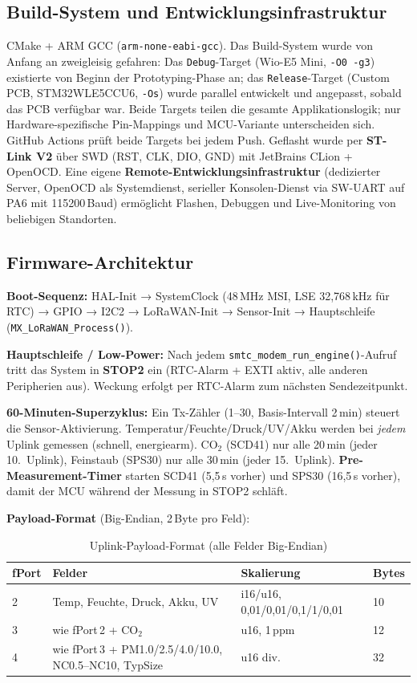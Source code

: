 \documentclass[11pt,a4paper]{scrartcl}
\begin{document}
\subsection*{Build-System und Entwicklungsinfrastruktur}

CMake + ARM GCC (\texttt{arm-none-eabi-gcc}). Das Build-System wurde von Anfang an zweigleisig gefahren: Das \texttt{Debug}-Target (Wio-E5 Mini, \texttt{-O0 -g3}) existierte von Beginn der Prototyping-Phase an; das \texttt{Release}-Target (Custom PCB, STM32WLE5CCU6, \texttt{-Os}) wurde parallel entwickelt und angepasst, sobald das PCB verfügbar war. Beide Targets teilen die gesamte Applikationslogik; nur Hardware-spezifische Pin-Mappings und MCU-Variante unterscheiden sich. GitHub Actions prüft beide Targets bei jedem Push. Geflasht wurde per \textbf{ST-Link V2} über SWD (RST, CLK, DIO, GND) mit JetBrains CLion + OpenOCD. Eine eigene \textbf{Remote-Entwicklungsinfrastruktur} (dedizierter Server, OpenOCD als Systemdienst, serieller Konsolen-Dienst via SW-UART auf PA6 mit 115200\,Baud) ermöglicht Flashen, Debuggen und Live-Monitoring von beliebigen Standorten.

\subsection*{Firmware-Architektur}

\textbf{Boot-Sequenz:} HAL-Init → SystemClock (48\,MHz MSI, LSE 32,768\,kHz für RTC) → GPIO → I2C2 → LoRaWAN-Init → Sensor-Init → Hauptschleife (\texttt{MX\_LoRaWAN\_Process()}).

\textbf{Hauptschleife / Low-Power:} Nach jedem \texttt{smtc\_modem\_run\_engine()}-Aufruf tritt das System in \textbf{STOP2} ein (RTC-Alarm + EXTI aktiv, alle anderen Peripherien aus). Weckung erfolgt per RTC-Alarm zum nächsten Sendezeitpunkt.

\textbf{60-Minuten-Superzyklus:} Ein Tx-Zähler (1–30, Basis-Intervall 2\,min) steuert die Sensor-Aktivierung. Temperatur/Feuchte/Druck/UV/Akku werden bei \textit{jedem} Uplink gemessen (schnell, energiearm). CO$_2$ (SCD41) nur alle 20\,min (jeder 10.~Uplink), Feinstaub (SPS30) nur alle 30\,min (jeder 15.~Uplink). \textbf{Pre-Measurement-Timer} starten SCD41 (5,5\,s vorher) und SPS30 (16,5\,s vorher), damit der MCU während der Messung in STOP2 schläft.

\textbf{Payload-Format} (Big-Endian, 2\,Byte pro Feld):

\begin{table}[H]
  \centering
  \small
  \begin{tabular}{llll}
    \hline
    \textbf{fPort} & \textbf{Felder} & \textbf{Skalierung} & \textbf{Bytes} \\
    \hline
    2 & Temp, Feuchte, Druck, Akku, UV & i16/u16, 0,01/0,01/0,1/1/0,01 & 10 \\
    3 & wie fPort\,2 + CO$_2$ & u16, 1\,ppm & 12 \\
    4 & wie fPort\,3 + PM1.0/2.5/4.0/10.0, NC0.5–NC10, TypSize & u16 div. & 32 \\
    \hline
  \end{tabular}
  \caption{Uplink-Payload-Format (alle Felder Big-Endian)}
\end{table}
\end{document}
